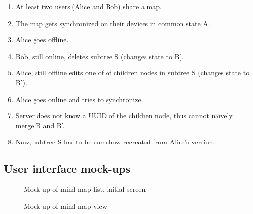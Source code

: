 \begin{enumerate}
	\item At least two users (Alice and Bob) share a map.
	\item The map gets synchronized on their devices in common state A.
	\item Alice goes offline.
	\item Bob, still online, deletes subtree S (changes state to B).
	\item Alice, still offline edits one of of children nodes in subtree S (changes state to B').
	\item Alice goes online and tries to synchronize.
	\item Server does not know a UUID of the children node, thus cannot naïvely merge B and B'.
	\item Now, subtree S has to be somehow recreated from Alice's version.
\end{enumerate}


\subsection{User interface mock-ups}
\label{subsec:ui-mockups}


\begin{figure}[h]
	\centering
	\caption{Mock-up of mind map list, initial screen.}
	\label{fig:mockup-maplist}
\end{figure}

\begin{figure}[h]
	\centering
	\caption{Mock-up of mind map view.}
	\label{fig:mockup-mindmap}
\end{figure}

